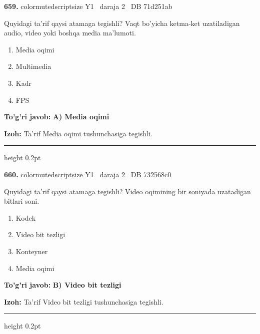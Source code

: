 \documentclass[10pt,a4paper,oneside]{article}
\begin{document}
\noindent\textbf{\color{ink}659.}  {color{muted}scriptsize Y1 \textbullet\ daraja 2 \textbullet\ DB 71d251ab}
\par
Quyidagi ta'rif qaysi atamaga tegishli? Vaqt bo'yicha ketma-ket uzatiladigan audio, video yoki boshqa media ma'lumoti.
\begin{enumerate}[label=\Alph*),leftmargin=9mm]
\item Media oqimi
\item Multimedia
\item Kadr
\item FPS
\end{enumerate}
\begin{tcolorbox}[enhanced,breakable,colback=teal!4,colframe=teal!50!black,boxrule=0.5pt,arc=1.1mm,left=3mm,right=3mm,top=1.7mm,bottom=1.7mm,before skip=2mm,after skip=2mm]
\textbf{\color{teal}To'g'ri javob:} \textbf{A) Media oqimi}
\par\smallskip
\textbf{Izoh:} Ta'rif Media oqimi tushunchasiga tegishli.
\end{tcolorbox}
\vspace{2mm}\hrule height 0.2pt \vspace{3mm}

\noindent\textbf{\color{ink}660.}  {color{muted}scriptsize Y1 \textbullet\ daraja 2 \textbullet\ DB 732568c0}
\par
Quyidagi ta'rif qaysi atamaga tegishli? Video oqimining bir soniyada uzatadigan bitlari soni.
\begin{enumerate}[label=\Alph*),leftmargin=9mm]
\item Kodek
\item Video bit tezligi
\item Konteyner
\item Media oqimi
\end{enumerate}
\begin{tcolorbox}[enhanced,breakable,colback=teal!4,colframe=teal!50!black,boxrule=0.5pt,arc=1.1mm,left=3mm,right=3mm,top=1.7mm,bottom=1.7mm,before skip=2mm,after skip=2mm]
\textbf{\color{teal}To'g'ri javob:} \textbf{B) Video bit tezligi}
\par\smallskip
\textbf{Izoh:} Ta'rif Video bit tezligi tushunchasiga tegishli.
\end{tcolorbox}
\vspace{2mm}\hrule height 0.2pt \vspace{3mm}
\end{document}
